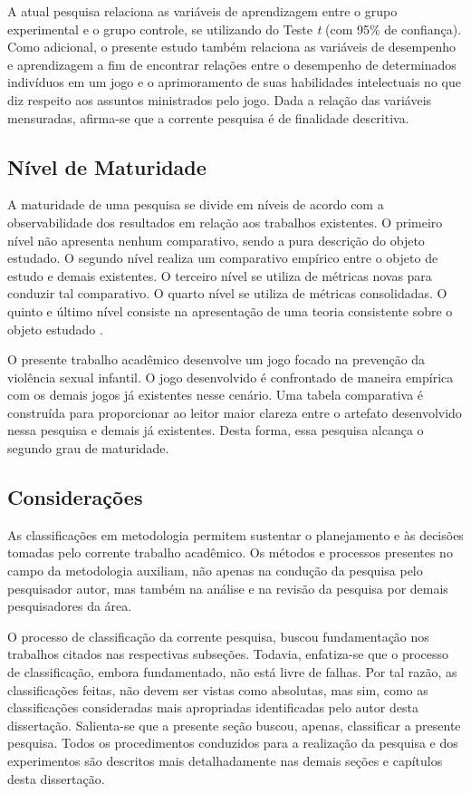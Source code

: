 A atual pesquisa relaciona as variáveis de aprendizagem entre o grupo experimental e o grupo controle, se utilizando do Teste \textit{t} (com 95\% de confiança). Como adicional, o presente estudo também relaciona as variáveis de desempenho e aprendizagem a fim de encontrar relações entre o desempenho de determinados indivíduos em um jogo e o aprimoramento de suas habilidades intelectuais no que diz respeito aos assuntos ministrados pelo jogo. Dada a relação das variáveis mensuradas, afirma-se que a corrente pesquisa é de finalidade descritiva.

\subsection{Nível de Maturidade}\label{sub:Maturidade}

A maturidade de uma pesquisa se divide em níveis de acordo com a observabilidade dos resultados em relação aos trabalhos existentes. O primeiro nível não apresenta nenhum comparativo, sendo a pura descrição do objeto estudado. O segundo nível realiza um comparativo empírico entre o objeto de estudo e demais existentes. O terceiro nível se utiliza de métricas novas para conduzir tal comparativo. O quarto nível se utiliza de métricas consolidadas. O quinto e último nível consiste na apresentação de uma teoria consistente sobre o objeto estudado \cite{wazlawick2014metodologia}.%

O presente trabalho acadêmico desenvolve um jogo focado na prevenção da violência sexual infantil. O jogo desenvolvido é confrontado de maneira empírica com os demais jogos já existentes nesse cenário. Uma tabela comparativa é construída para proporcionar ao leitor maior clareza entre o artefato desenvolvido nessa pesquisa e demais já existentes. Desta forma, essa pesquisa alcança o segundo grau de maturidade. 


\subsection{Considerações}\label{sub:Considerar}

As classificações em metodologia permitem sustentar o planejamento e às decisões tomadas pelo corrente trabalho acadêmico. Os métodos e processos presentes no campo da metodologia auxiliam, não apenas na condução da pesquisa pelo pesquisador autor, mas também na análise e na revisão da pesquisa por demais pesquisadores da área.

O processo de classificação da corrente pesquisa, buscou fundamentação nos trabalhos citados nas respectivas subseções. Todavia, enfatiza-se que o processo de classificação, embora fundamentado, não está livre de falhas. Por tal razão, as classificações feitas, não devem ser vistas como absolutas, mas sim, como as classificações consideradas mais apropriadas identificadas pelo autor desta dissertação. Salienta-se que a presente seção buscou, apenas, classificar a presente pesquisa. Todos os procedimentos conduzidos para a realização da pesquisa e dos experimentos são descritos mais detalhadamente nas demais seções e capítulos desta dissertação.

